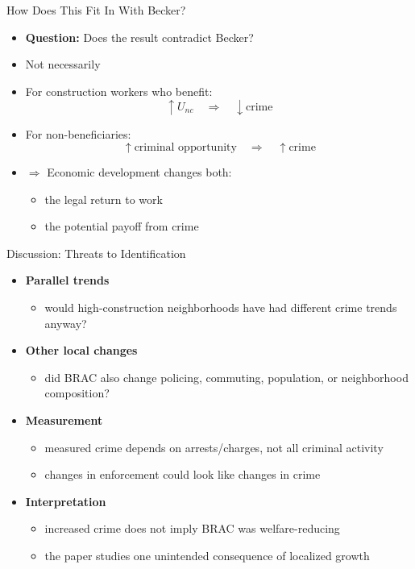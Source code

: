 \documentclass[11pt,notes=hide,aspectratio=169,mathserif]{beamer}
\begin{document}
\begin{frame}{How Does This Fit In With Becker?}
\begin{itemize}
\item \textbf{Question:} Does the result contradict Becker?
\pause \item Not necessarily
\pause \item For construction workers who benefit:
\[
\uparrow U_{nc} \quad \Rightarrow \quad \downarrow \text{crime}
\]
\pause \item For non-beneficiaries:
\[
\uparrow \text{criminal opportunity} \quad \Rightarrow \quad \uparrow \text{crime}
\]
\pause \item $\Rightarrow$ Economic development changes both:
\begin{itemize}
\item the legal return to work
\item the potential payoff from crime
\end{itemize}
\end{itemize}
\end{frame}

\begin{frame}{Discussion: Threats to Identification}
\begin{itemize}
\item \textbf{Parallel trends}
\begin{itemize}
\item would high-construction neighborhoods have had different crime trends anyway?
\end{itemize}
\pause \item \textbf{Other local changes}
\begin{itemize}
\item did BRAC also change policing, commuting, population, or neighborhood composition?
\end{itemize}
\pause \item \textbf{Measurement}
\begin{itemize}
\item measured crime depends on arrests/charges, not all criminal activity
\item changes in enforcement could look like changes in crime
\end{itemize}
\pause \item \textbf{Interpretation}
\begin{itemize}
\item increased crime does not imply BRAC was welfare-reducing
\item the paper studies one unintended consequence of localized growth
\end{itemize}
\end{itemize}
\end{frame}
\end{document}
